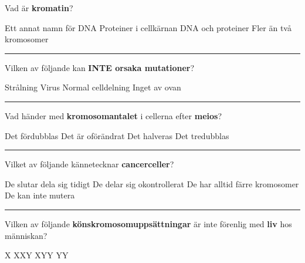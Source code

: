 \documentclass{exam}
\begin{document}
\begin{questions}
\break

\question Vad är \textbf{kromatin}?
\begin{checkboxes}
   \choice Ett annat namn för DNA
   \choice Proteiner i cellkärnan
   \correctchoice DNA och proteiner
   \choice Fler än två kromosomer
\end{checkboxes}

\vspace{5mm}\hrule\vspace{5mm}

\question Vilken av följande kan \textbf{INTE orsaka mutationer}?
\begin{checkboxes}
   \choice Strålning
   \choice Virus
   \choice Normal celldelning
   \correctchoice Inget av ovan
\end{checkboxes}

\vspace{5mm}\hrule\vspace{5mm}


\question Vad händer med \textbf{kromosomantalet} i cellerna efter \textbf{meios}?
\begin{checkboxes}
   \choice Det fördubblas
   \choice Det är oförändrat
   \correctchoice Det halveras
   \choice Det tredubblas
\end{checkboxes}

\vspace{5mm}\hrule\vspace{5mm}

\question Vilket av följande kännetecknar \textbf{cancerceller}?
\begin{checkboxes}
   \choice De slutar dela sig tidigt
   \correctchoice De delar sig okontrollerat
   \choice De har alltid färre kromosomer
   \choice De kan inte mutera
\end{checkboxes}

\vspace{5mm}\hrule\vspace{5mm}
\question Vilken av följande \textbf{könskromosomuppsättningar} är inte förenlig med \textbf{liv} hos människan?
\begin{checkboxes}
   \choice X 
   \choice XXY
   \choice XYY
   \correctchoice YY
\end{checkboxes}

\break

\vspace{5mm}
\begin{center}
\end{center}
\vspace{5mm}


\end{questions}
\end{document}
